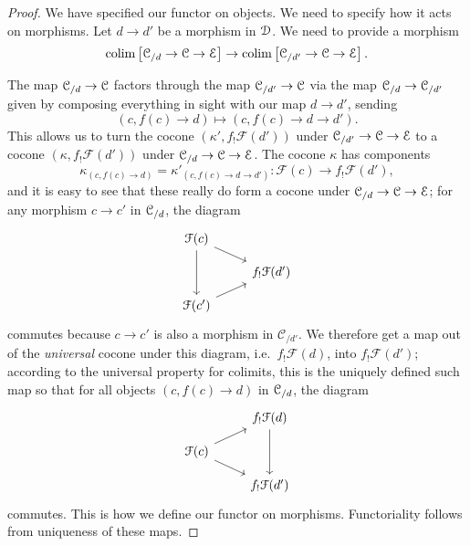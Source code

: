 \documentclass[main.tex]{subfiles}
\begin{document}
\begin{proof}
  We have specified our functor on objects. We need to specify how it acts on morphisms. Let $d \to d'$ be a morphism in $\mathcal{D}$. We need to provide a morphism
  \begin{equation}
    \label{eq:map_between_colimits_defining_kan_extension_on_morphism}
    \operatorname*{colim}\left[ \mathcal{C}_{/d} \to \mathcal{C} \to \mathcal{E} \right] \to \operatorname*{colim}\left[ \mathcal{C}_{/d'} \to \mathcal{C} \to \mathcal{E} \right].
  \end{equation}

  The map $\mathcal{C}_{/d} \to \mathcal{C}$ factors through the map $\mathcal{C}_{/d'} \to \mathcal{C}$ via the map $\mathcal{C}_{/d} \to \mathcal{C}_{/d'}$ given by composing everything in sight with our map $d \to d'$, sending
  \begin{equation*}
    (c, f(c) \to d) \mapsto (c, f(c) \to d \to d').
  \end{equation*}
  This allows us to turn the cocone $(\kappa', f_{!}\mathcal{F}(d'))$ under $\mathcal{C}_{/d'} \to \mathcal{C} \to \mathcal{E}$ to a cocone $(\kappa, f_{!}\mathcal{F}(d'))$ under $\mathcal{C}_{/d} \to \mathcal{C} \to \mathcal{E}$. The cocone $\kappa$ has components 
  \begin{equation*}
    \kappa_{(c, f(c) \to d)} = \kappa'_{(c, f(c) \to d \to d')}\colon \mathcal{F}(c) \to f_{!}\mathcal{F}(d'),
  \end{equation*}
  and it is easy to see that these really do form a cocone under $\mathcal{C}_{/d} \to \mathcal{C} \to \mathcal{E}$; for any morphism $c \to c'$ in $\mathcal{C}_{/d}$, the diagram
  \begin{equation}
    \label{eq:first_triangle_kan_extension}
    \begin{tikzcd}[row sep=small]
      \mathcal{F}(c)
      \arrow[dd]
      \arrow[dr]
      \\
      & f_{!}\mathcal{F}(d')
      \\
      \mathcal{F}(c')
      \arrow[ur]
    \end{tikzcd}
  \end{equation}
  commutes because $c \to c'$ is also a morphism in $\mathcal{C}_{/d'}$. We therefore get a map out of the \emph{universal} cocone under this diagram, i.e.\ $f_{!}\mathcal{F}(d)$, into $f_{!}\mathcal{F}(d')$; according to the universal property for colimits, this is the uniquely defined such map so that for all objects $(c, f(c) \to d)$ in $\mathcal{C}_{/d}$, the diagram
  \begin{equation}
    \label{eq:second_triangle_kan_extension}
    \begin{tikzcd}[row sep=small]
      & f_{!}\mathcal{F}(d)
      \arrow[dd]
      \\
      \mathcal{F}(c)
      \arrow[ur]
      \arrow[dr]
      \\
      & f_{!}\mathcal{F}(d')
    \end{tikzcd}
  \end{equation}
  commutes. This is how we define our functor on morphisms. Functoriality follows from uniqueness of these maps.


\end{proof}
\end{document}
